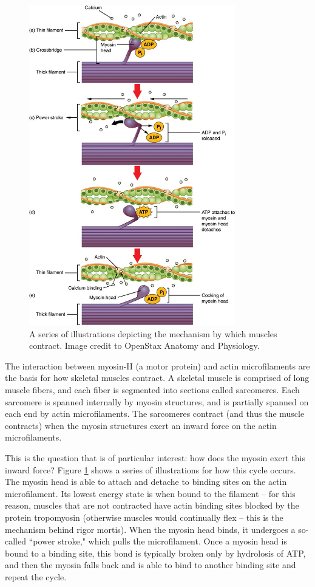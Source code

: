 \documentclass[11pt]{ucthesis}
\begin{document}
\begin{figure}
\centering
\includegraphics[width=0.8\textwidth]{actinmyosin}
\caption{A series of illustrations depicting the mechanism by which muscles contract. Image credit to OpenStax Anatomy and Physiology.\label{fig:actinmyosin}}
\end{figure}

The interaction between myosin-II (a motor protein) and actin microfilaments are the basis for how skeletal muscles contract. A skeletal muscle is comprised of long muscle fibers, and each fiber is segmented into sections called sarcomeres. Each sarcomere is spanned internally by myosin structures, and is partially spanned on each end by actin microfilaments. The sarcomeres contract (and thus the muscle contracts) when the myosin structures exert an inward force on the actin microfilaments.

This is the question that is of particular interest: how does the myosin exert this inward force? Figure \ref{fig:actinmyosin} shows a series of illustrations for how this cycle occurs. The myosin head is able to attach and detache to binding sites on the actin microfilament. Its lowest energy state is when bound to the filament -- for this reason, muscles that are not contracted have actin binding sites blocked by the protein tropomyosin (otherwise muscles would continually flex -- this is the mechanism behind rigor mortis). When the myosin head binds, it undergoes a so-called ``power stroke," which pulls the microfilament. Once a myosin head is bound to a binding site, this bond is typically broken only by hydrolosis of ATP, and then the myosin falls back and is able to bind to another binding site and repeat the cycle.
\end{document}
